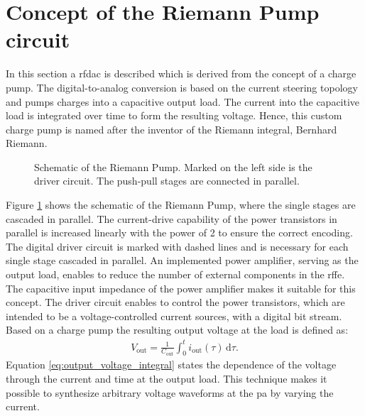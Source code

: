 \documentclass[journal]{IEEEtran}
\begin{document}
\section{Concept of the Riemann Pump circuit}
\label{sec:theory}
%
In this section a \gls{rfdac} is described which is derived from the concept of a charge pump.
The digital-to-analog conversion is based on the current steering topology and pumps charges into a capacitive output load.
The current into the capacitive load is integrated over time to form the resulting voltage.
Hence, this custom charge pump is named after the inventor of the Riemann integral, Bernhard Riemann.
%
\begin{figure}[htb]
  \centering
	\begin{scriptsize}
  	\def\svgwidth{\columnwidth}
 	 
  	\caption{Schematic of the Riemann Pump. Marked on the left side is the driver circuit. The push-pull stages are connected in parallel.}
  	\label{fig:schematic_multibit_rp}
	\end{scriptsize}
\end{figure}
%
Figure \ref{fig:schematic_multibit_rp} shows the schematic of the Riemann Pump, where the single stages are cascaded in parallel.
The current-drive capability of the power transistors in parallel is increased linearly with the power of 2 to ensure the correct encoding.
The digital driver circuit is marked with dashed lines and is necessary for each single stage cascaded in parallel.
An implemented power amplifier, serving as the output load, enables to reduce the number of external components in the \gls{rffe}.
The capacitive input impedance of the power amplifier makes it suitable for this concept.
The driver circuit enables to control the power transistors, which are intended to be a voltage-controlled current sources, with a digital bit stream.
Based on a charge pump the resulting output voltage at the load is defined as:
%
\begin{align}
  V_{\text{out}} =  \frac{1}{C_{\text{out}}} \int_0^t \! i_{\text{out}}(\tau) \, \mathrm{d}\tau.
    \label{eq:output_voltage_integral}
\end{align}
%
Equation \ref{eq:output_voltage_integral} states the dependence of the voltage through the current and time at the output load.
This technique makes it possible to synthesize arbitrary voltage waveforms at the \gls{pa} by varying the current.
\end{document}
